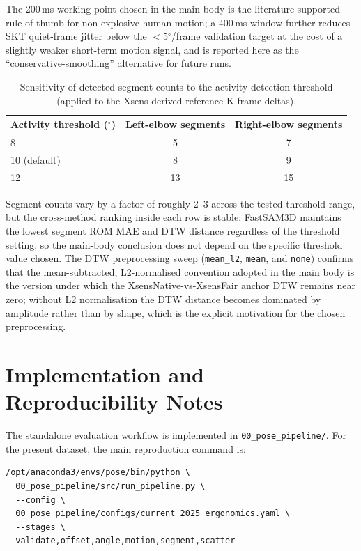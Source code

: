 \documentclass[12pt,a4paper]{article}
\newcommand{\degr}{\ensuremath{^\circ}}
\begin{document}
The 200\,ms working point chosen in the main body is the
literature-supported rule of thumb for non-explosive human motion; a
400\,ms window further reduces SKT quiet-frame jitter below the
$<$5\degr/frame validation target at the cost of a slightly weaker
short-term motion signal, and is reported here as the
``conservative-smoothing'' alternative for future runs.

\begin{table}[!htbp]
  \centering
  \caption{Sensitivity of detected segment counts to the activity-detection threshold (applied to the Xsens-derived reference K-frame deltas).}
  \label{tab:sens_segments}
  \small
  \begin{tabular}{lcc}
    \toprule
    Activity threshold (\degr) & Left-elbow segments & Right-elbow segments \\
    \midrule
    8  & 5  & 7  \\
    10 (default) & 8 & 9 \\
    12 & 13 & 15 \\
    \bottomrule
  \end{tabular}
\end{table}

Segment counts vary by a factor of roughly 2--3 across the tested
threshold range, but the cross-method ranking inside each row is stable:
FastSAM3D maintains the lowest segment ROM MAE and DTW distance
regardless of the threshold setting, so the main-body conclusion does
not depend on the specific threshold value chosen.
The DTW preprocessing sweep (\texttt{mean\_l2}, \texttt{mean}, and
\texttt{none}) confirms that the mean-subtracted, L2-normalised
convention adopted in the main body is the version under which the
XsensNative-vs-XsensFair anchor DTW remains near zero; without L2
normalisation the DTW distance becomes dominated by amplitude rather
than by shape, which is the explicit motivation for the chosen
preprocessing.

\FloatBarrier
\clearpage
\section{Implementation and Reproducibility Notes}
\label{app:repro}

The standalone evaluation workflow is implemented in
\texttt{00\_pose\_pipeline/}.
For the present dataset, the main reproduction command is:
\begin{footnotesize}
\begin{verbatim}
/opt/anaconda3/envs/pose/bin/python \
  00_pose_pipeline/src/run_pipeline.py \
  --config \
  00_pose_pipeline/configs/current_2025_ergonomics.yaml \
  --stages \
  validate,offset,angle,motion,segment,scatter
\end{verbatim}
\end{footnotesize}
\end{document}
